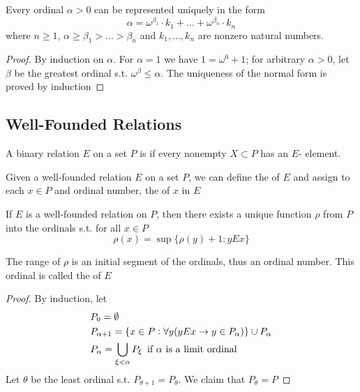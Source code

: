 \documentclass[11pt]{article}
\begin{document}
\begin{theorem}
Every ordinal \(\alpha>0\) can be represented uniquely in the form
\begin{equation*}
\alpha=\omega^{\beta_1}\cdot k_1+\dots+\omega^{\beta_n}\cdot k_n
\end{equation*}
where \(n\ge 1\), \(\alpha\ge\beta_1>\dots>\beta_n\) and \(k_1,\dots,k_n\) are
nonzero natural numbers.
\end{theorem}
\begin{proof}
By induction on \(\alpha\). For \(\alpha=1\) we have \(1=\omega^0+1\); for arbitrary
\(\alpha>0\), let \(\beta\) be the greatest ordinal s.t. \(\omega^\beta\le
   \alpha\).
The uniqueness of the normal form is proved by induction
\end{proof}


\subsection{Well-Founded Relations}
\label{sec:org67a010e}
A binary relation \(E\) on a set \(P\) is  if every nonempty
\(X\subset P\) has an \(E\)- element.

Given a well-founded relation \(E\) on a set \(P\), we can define the 
of \(E\) and assign to each \(x\in P\) and ordinal number, the  of \(x\)
in \(E\)

\begin{theorem}[]
If \(E\) is a well-founded relation on \(P\), then there exists a unique function
\(\rho\) from \(P\) into the ordinals s.t. for all \(x\in P\)
\begin{equation*}
\rho(x)=\sup\{\rho(y)+1:yEx\}
\end{equation*}
\end{theorem}
The range of \(\rho\) is an initial segment of the ordinals, thus an ordinal
number. This ordinal is called the  of \(E\)

\begin{proof}
By induction, let
\begin{align*}
&P_0=\emptyset\\
&P_{\alpha+1}=\{x\in P:\forall y(yEx\to y\in P_\alpha)\}\cup P_\alpha\\
&P_\alpha=\displaystyle\bigcup_{\xi<\alpha}P_\xi \enspace\text{if } \alpha 
\text{ is a limit ordinal}
\end{align*}
Let \(\theta\) be the least ordinal s.t. \(P_{\theta+1}=P_\theta\). We claim that
\(P_\theta=P\) 
\end{proof}
\end{document}
